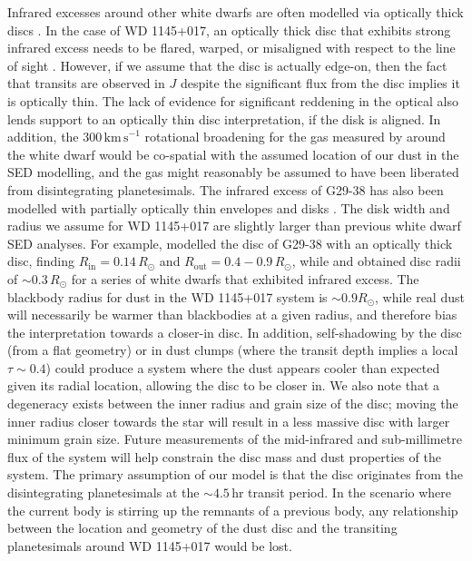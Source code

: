 \documentclass[useAMS,usenatbib]{mn2e}
\begin{document}
Infrared excesses around other white dwarfs are often modelled via optically thick discs \citep[e.g.][]{2003ApJ...584L..91J,2009ApJ...694..805F}. In the case of WD 1145+017, an optically thick disc that exhibits strong infrared excess needs to be flared, warped, or misaligned with respect to the line of sight \citep{2015Natur.526..546V,2016ApJ...816L..22X}. However, if we assume that the disc is actually edge-on, then the fact that transits are observed in $J$ despite the significant flux from the disc implies it is optically thin. The lack of evidence for significant reddening in the optical also lends support to an optically thin disc interpretation, if the disk is aligned. In addition, the $300\,\mathrm{km\,s}^{-1}$ rotational broadening for the gas measured by \citet{2016ApJ...816L..22X} around the white dwarf would be co-spatial with the assumed location of our dust in the SED modelling, and the gas might reasonably be assumed to have been liberated from disintegrating planetesimals. The infrared excess of G29-38 has also been modelled with partially optically thin envelopes and disks \citep[e.g. G29-38,][]{2005ApJ...635L.161R,2009ApJ...693..697R}. The disk width and radius we assume for WD 1145+017 are slightly larger than previous white dwarf SED analyses. For example, \citet{2003ApJ...584L..91J} modelled the disc of G29-38 with an optically thick disc, finding $R_\mathrm{in} = 0.14\,R_\odot$ and $R_\mathrm{out} = 0.4-0.9\,R_\odot$, while \citet{2009ApJ...694..805F} and \citet{2014ApJ...786...77B} obtained disc radii of $\sim 0.3\,R_\odot$ for a series of white dwarfs that exhibited infrared excess. The blackbody radius for dust in the WD 1145+017 system is $\sim 0.9 R_\odot$, while real dust will necessarily be warmer than blackbodies at a given radius, and therefore bias the interpretation towards a closer-in disc. In addition, self-shadowing by the disc (from a flat geometry) or in dust clumps (where the transit depth implies a local $\tau \sim 0.4$) could produce a system where the dust appears cooler than expected given its radial location, allowing the disc to be closer in. We also note that a degeneracy exists between the inner radius and grain size of the disc; moving the inner radius closer towards the star will result in a less massive disc with larger minimum grain size. Future measurements of the mid-infrared and sub-millimetre flux of the system will help constrain the disc mass and dust properties of the system. The primary assumption of our model is that the disc originates from the disintegrating planetesimals at the $\sim 4.5$\,hr transit period. In the scenario where the current body is stirring up the remnants of a previous body, any relationship between the location and geometry of the dust disc and the transiting planetesimals around WD 1145+017 would be lost.
\end{document}
